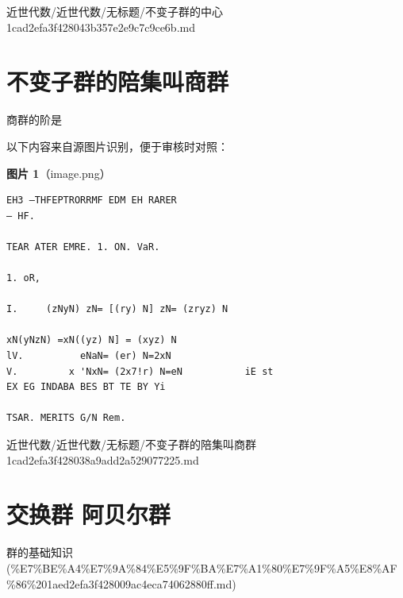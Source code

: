\begin{note}[来源路径]

近世代数/近世代数/无标题/不变子群的中心 1cad2efa3f428043b357e2e9c7c9ce6b.md

\end{note}

\section*{不变子群的陪集叫商群}

\begin{note}[不变子群的陪集叫商群]

商群的阶是

\end{note}

\begin{note}
以下内容来自源图片识别，便于审核时对照：

\textbf{图片 1}（image.png）
\begin{Verbatim}[fontsize=\small]
EH3 —THFEPTRORRMF EDM EH RARER
— HF.

TEAR ATER EMRE. 1. ON. VaR.

1. oR,

I.     (zNyN) zN= [(ry) N] zN= (zryz) N

xN(yNzN) =xN((yz) N] = (xyz) N
lV.          eNaN= (er) N=2xN
V.         x 'NxN= (2x7!r) N=eN           iE st
EX EG INDABA BES BT TE BY Yi

TSAR. MERITS G/N Rem.
\end{Verbatim}

\end{note}

\begin{note}[来源路径]

近世代数/近世代数/无标题/不变子群的陪集叫商群 1cad2efa3f428038a9add2a529077225.md

\end{note}

\section*{交换群 阿贝尔群}

\begin{note}[来源上级主题]

群的基础知识 (\%E7\%BE\%A4\%E7\%9A\%84\%E5\%9F\%BA\%E7\%A1\%80\%E7\%9F\%A5\%E8\%AF\%86\%201aed2efa3f428009ac4eca74062880ff.md)

\end{note}

